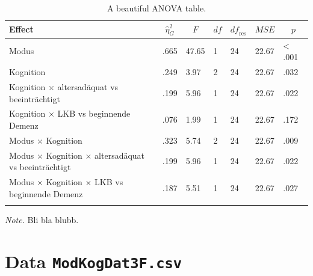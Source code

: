 \documentclass[
  doc,floatsintext]{apa6}
\begin{document}
\begin{table}[tbp]

\begin{center}
\begin{threeparttable}

\caption{\label{tab:tabanovaext}A beautiful ANOVA table.}

\begin{tabular}{lllllll}
\toprule
Effect & \multicolumn{1}{c}{$\hat{\eta}^2_G$} & \multicolumn{1}{c}{$F$} & \multicolumn{1}{c}{$\mathit{df}$} & \multicolumn{1}{c}{$\mathit{df}_{\mathrm{res}}$} & \multicolumn{1}{c}{$\mathit{MSE}$} & \multicolumn{1}{c}{$p$}\\
\midrule
Modus & .665 & 47.65 & 1 & 24 & 22.67 & < .001\\
Kognition & .249 & 3.97 & 2 & 24 & 22.67 & .032\\
Kognition $\times$  altersadäquat vs beeinträchtigt & .199 & 5.96 & 1 & 24 & 22.67 & .022\\
Kognition $\times$  LKB vs beginnende Demenz & .076 & 1.99 & 1 & 24 & 22.67 & .172\\
Modus $\times$ Kognition & .323 & 5.74 & 2 & 24 & 22.67 & .009\\
Modus $\times$ Kognition $\times$  altersadäquat vs beeinträchtigt & .199 & 5.96 & 1 & 24 & 22.67 & .022\\
Modus $\times$ Kognition $\times$  LKB vs beginnende Demenz & .187 & 5.51 & 1 & 24 & 22.67 & .027\\
\bottomrule
\addlinespace
\end{tabular}

\begin{tablenotes}[para]
\normalsize{\textit{Note.} Bli bla blubb.}
\end{tablenotes}

\end{threeparttable}
\end{center}

\end{table}

\hypertarget{data-modkogdat3f.csv}{%
\section{\texorpdfstring{Data \texttt{ModKogDat3F.csv}}{Data ModKogDat3F.csv}}\label{data-modkogdat3f.csv}}
\end{document}
